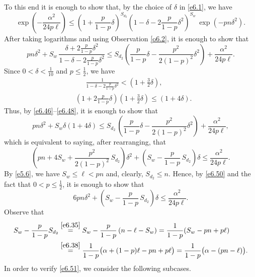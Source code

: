 \documentclass[10pt]{amsart}
\theoremstyle{remark}
\newcommand{\mik}{\leqslant}
\begin{document}
To this end it is enough to show that, by the choice of $\delta$ in \eqref{e6.1}, we have
\begin{equation} \label{e6.45}
\exp\left(-\frac{\alpha^2}{24p\ell}\right) \mik \left(1+\frac{p}{1-p}\delta\right)^{S_{d_2}}
\left(1-\delta-2\frac{p}{1-p}\delta^2\right)^{S_w}\, \exp(-pn\delta^2).
\end{equation}
After taking logarithms and using Observation \ref{o6.2}, it is enough to show that
\begin{equation} \label{e6.46}
pn\delta^2+S_w\, \frac{\delta+2\frac{p}{1-p}\delta^2}{1-\delta-2\frac{p}{1-p}\delta^2} \mik S_{d_2}\left(\frac{p}{1-p}\delta-\frac{p^2}{2(1-p)^2}\delta^2\right)+\frac{\alpha^2}{24p\ell}.
\end{equation}
Since $0<\delta<\frac{1}{10}$ and $p\mik \frac12$, we have
\begin{align}
\label{e6.47} & \ \ \ \ \ \ \, \frac{1}{1-\delta-2\frac{p}{1-p}\delta^2} < \left(1+\frac32\delta\right), \\
\label{e6.48} & \left(1+2\frac{p}{1-p}\delta\right) \left(1+\frac32\delta\right)\mik (1+4\delta).
\end{align}
Thus, by \eqref{e6.46}--\eqref{e6.48}, it is enough to show that
\begin{equation} \label{e6.49}
pn\delta^2+S_w\delta(1+4\delta)\mik S_{d_2}\, \left(\frac{p}{1-p}\delta-\frac{p^2}{2(1-p)^2}\delta^2\right)
+\frac{\alpha^2}{24p\ell},
\end{equation}
which is equivalent to saying, after rearranging, that
\begin{equation} \label{e6.50}
\left(pn+4S_w+\frac{p^2}{2(1-p)^2}\, S_{d_2}\right)\delta^2+\left(S_w-\frac{p}{1-p}\,S_{d_2}\right)\delta
\mik \frac{\alpha^2}{24p\ell}.
\end{equation}
By \eqref{e5.6}, we have $S_w\mik\ell< pn$ and, clearly, $S_{d_2}\mik n$.
Hence, by \eqref{e6.50} and the fact that $0<p\mik \frac12$, it is enough to show that
\begin{equation} \label{e6.51}
6pn\delta^2 +\left(S_w-\frac{p}{1-p}\,S_{d_2}\right)\delta \mik \frac{\alpha^2}{24p\ell}.
\end{equation}
Observe that
\begin{align}
\label{e6.52} S_w-\frac{p}{1-p}S_{d_2} & \stackrel{\eqref{e6.35}}{=}
S_w-\frac{p}{1-p}\left(n-\ell-S_w\right) =\frac{1}{1-p}(S_w-pn+p\ell) \\
& \stackrel{\eqref{e6.38}}{=} \frac{1}{1-p}\big(\alpha+(1-p)\ell-pn+p\ell\big) =
\frac{1}{1-p}\big(\alpha-(pn-\ell)\big). \nonumber
\end{align}
In order to verify \eqref{e6.51}, we consider the following subcases.
\end{document}
